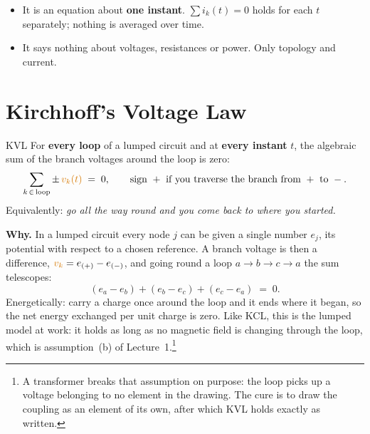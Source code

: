 \documentclass[11pt,a4paper]{article}
\newcommand{\Vcol}[1]{\textcolor{cvolt}{#1}}
\begin{document}
\begin{cautionbox}
\begin{itemize}
  \item It is an equation about \textbf{one instant}. $\sum i_k(t) = 0$ holds for each $t$
        separately; nothing is averaged over time.
  \item It says nothing about voltages, resistances or power. Only topology and current.
\end{itemize}
\end{cautionbox}

\section{Kirchhoff's Voltage Law}

\begin{definitionbox}{KVL}
For \textbf{every loop} of a lumped circuit and at \textbf{every instant} $t$, the
algebraic sum of the branch voltages around the loop is zero:
\[
  \sum_{k \,\in\, \text{loop}} \pm\, \Vcol{v_k(t)} \;=\; 0 ,
  \qquad
  \text{sign } + \text{ if you traverse the branch from } + \text{ to } - .
\]
Equivalently: \emph{go all the way round and you come back to where you started.}
\end{definitionbox}

\textbf{Why.} In a lumped circuit every node $j$ can be given a single number $e_j$, its
potential with respect to a chosen reference. A branch voltage is then a difference,
$\Vcol{v_k} = e_{(+)} - e_{(-)}$, and going round a loop $a \to b \to c \to a$ the sum
telescopes:
\[
  (e_a - e_b) + (e_b - e_c) + (e_c - e_a) \;=\; 0 .
\]
Energetically: carry a charge once around the loop and it ends where it began, so the net
energy exchanged per unit charge is zero. Like KCL, this is the lumped model at work: it
holds as long as no magnetic field is changing through the loop, which is
assumption~(b) of Lecture~1.\footnote{A
transformer breaks that assumption on purpose: the loop picks up a voltage belonging to no
element in the drawing. The cure is to draw the coupling as an element of its own, after
which KVL holds exactly as written.}

\begin{center}
\end{center}
\end{document}
